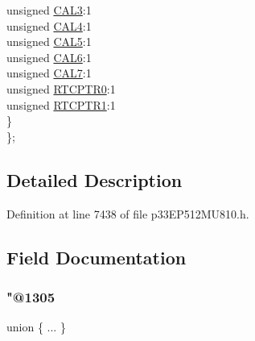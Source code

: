 \begin{DoxyCompactItemize}
\begin{tabbing}
\>\>unsigned \hyperlink{structtag_r_c_f_g_c_a_l_b_i_t_s_a1bcb154674fe4822ec09db9803e2ce71}{CAL3}:1\\
\>\>unsigned \hyperlink{structtag_r_c_f_g_c_a_l_b_i_t_s_ad42fd7ec4ef7a0aa509e6642cbb0eb42}{CAL4}:1\\
\>\>unsigned \hyperlink{structtag_r_c_f_g_c_a_l_b_i_t_s_a1f6abcdad60835fcbbf63efa20aa78c9}{CAL5}:1\\
\>\>unsigned \hyperlink{structtag_r_c_f_g_c_a_l_b_i_t_s_a779ad100d981f1ba9f0670acc2b33901}{CAL6}:1\\
\>\>unsigned \hyperlink{structtag_r_c_f_g_c_a_l_b_i_t_s_a02a482811f2e5469459d0f09dd72ba6b}{CAL7}:1\\
\>\>unsigned \hyperlink{structtag_r_c_f_g_c_a_l_b_i_t_s_a300ec8841f70d0384256b0057323605f}{RTCPTR0}:1\\
\>\>unsigned \hyperlink{structtag_r_c_f_g_c_a_l_b_i_t_s_a0e466d9aaacd465c15f11a950afb8de3}{RTCPTR1}:1\\
\>\} \\
\}; \\

\end{tabbing}\end{DoxyCompactItemize}


\subsection{Detailed Description}


Definition at line 7438 of file p33\+E\+P512\+M\+U810.\+h.



\subsection{Field Documentation}
\mbox{\label{structtag_r_c_f_g_c_a_l_b_i_t_s_ae28133172b0ab19c6bd8d28df01f44a0}} 
\subsubsection{\texorpdfstring{"@1305}{@1305}}
{\footnotesize\ttfamily union \{ ... \} }

\mbox{\label{structtag_r_c_f_g_c_a_l_b_i_t_s_adf71f3d8410c1f1dbbc96680a92c49af}} 
